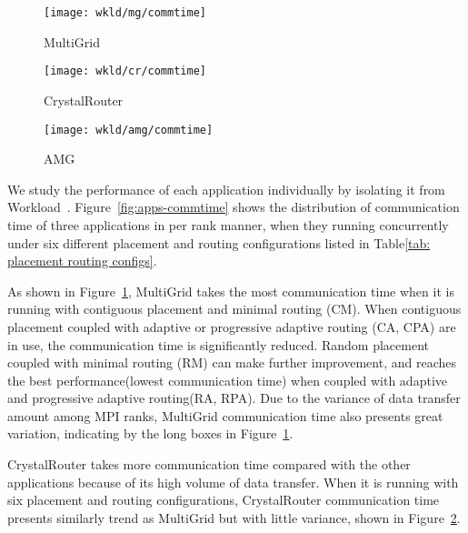 \begin{figure*}[t!]
    \centering
    \begin{subfigure}[t]{0.32\textwidth}
        \centering
        \texttt{[image: wkld/mg/commtime]}
        \caption{MultiGrid}
        \label{fig:mg-commtime}
    \end{subfigure}%
    \hspace{1em}%
    \begin{subfigure}[t]{0.32\textwidth}
        \centering
        \texttt{[image: wkld/cr/commtime]}
        \caption{CrystalRouter}
        \label{fig:cr-commtime}
    \end{subfigure}%
    \hspace{1em}%
    \begin{subfigure}[t]{0.32\textwidth}
        \centering
        \texttt{[image: wkld/amg/commtime]}
        \caption{AMG}
        \label{fig:amg-commtime}
    \end{subfigure}%
    \caption{The communication time of all ranks in each application. Random placement and adaptive routing can improve the communication time of MultiGrid and CrystalRouter, while AMG's communication time is greatly prolonged.}
   \label{fig:apps-commtime}
\end{figure*}



We study the performance of each application individually by isolating it from Workload~.   
Figure~\ref{fig:apps-commtime} shows the distribution of communication time of three applications in per rank manner, 
when they running concurrently under six different placement and routing configurations listed in Table\ref{tab: placement routing configs}.

As shown in Figure~\ref{fig:mg-commtime}, 
MultiGrid takes the most communication time when it is running with contiguous placement and minimal routing (CM). 
When contiguous placement coupled with adaptive or progressive adaptive routing (CA, CPA) are in use, 
the communication time is significantly reduced. 
Random placement coupled with minimal routing (RM) can make further improvement, 
and reaches the best performance(lowest communication time) when coupled with adaptive and progressive adaptive routing(RA, RPA). 
Due to the variance of data transfer amount among MPI ranks, 
MultiGrid communication time also presents great variation, 
indicating by the long boxes in Figure~\ref{fig:mg-commtime}.

CrystalRouter takes more communication time compared with the other applications because of its high volume of data transfer. 
When it is running with six placement and routing configurations, 
CrystalRouter communication time presents similarly trend as MultiGrid but with little variance, shown in Figure~\ref{fig:cr-commtime}. 


